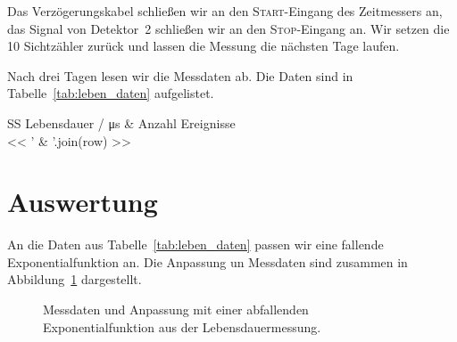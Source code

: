 \documentclass[11pt, ngerman, fleqn, DIV=15, headinclude, BCOR=2cm]{scrreprt}
\begin{document}
Das Verzögerungskabel schließen wir an den \textsc{Start}-Eingang des
Zeitmessers an, das Signal von Detektor~2 schließen wir an den
\textsc{Stop}-Eingang an. Wir setzen die 10 Sichtzähler zurück und lassen die
Messung die nächsten Tage laufen.

Nach drei Tagen lesen wir die Messdaten ab. Die Daten sind in
Tabelle~\ref{tab:leben_daten} aufgelistet.

\begin{table}[htbp]
    \centering
    \begin{tabular}{SS}
        {Lebensdauer / \si{\micro\second}} & {Anzahl Ereignisse} \\
        \midrule
        << ' & '.join(row) >> \\
    \end{tabular}
    \caption{%
        Messdaten nach drei Tagen Lebensdauermessung.
    }
    \label{tab:leben_daten}
\end{table}

\section{Auswertung}

An die Daten aus Tabelle~\ref{tab:leben_daten} passen wir eine fallende
Exponentialfunktion an. Die Anpassung un Messdaten sind zusammen in
Abbildung~\ref{fig:leben-fit} dargestellt.

\begin{figure}[htbp]
    \centering
    \caption{%
        Messdaten und Anpassung mit einer abfallenden Exponentialfunktion aus
        der Lebensdauermessung.
    }
    \label{fig:leben-fit}
\end{figure}
\end{document}
